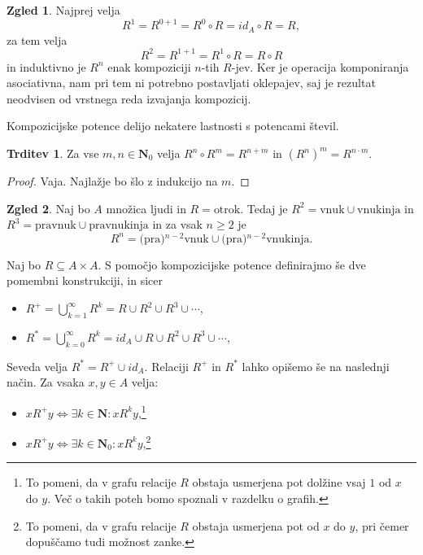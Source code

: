 \documentclass[11pt]{book}
\def\NN{\mathbf{N}}
\theoremstyle{definition}
\theoremstyle{zgled}
\newtheorem*{zgled}{Zgled}
\theoremstyle{odprtproblem}
\theoremstyle{domacanaloga}
\newenvironment{dokaz}
    {\color{siva}\begin{proof}}
    {\end{proof}}
\theoremstyle{izrek}
\newtheorem*{trditev}{Trditev}
\begin{document}
\begin{zgled}
Najprej velja
\[
    R^1 = R^{0+1} = R^0 \circ R = id_A \circ R = R,
\]
za tem velja
\[
    R^2 = R^{1+1} = R^1 \circ R = R \circ R
\]
in induktivno je $R^n$ enak kompoziciji $n$-tih $R$-jev. Ker je operacija komponiranja asociativna, nam pri tem ni potrebno postavljati oklepajev, saj je rezultat neodvisen od vrstnega reda izvajanja kompozicij.
\end{zgled}

Kompozicijske potence delijo nekatere lastnosti s potencami števil.

\begin{trditev}
Za vse $m,n \in \NN_0$ velja $R^n \circ R^m = R^{n+m}$ in $(R^n)^m = R^{n \cdot m}$.
\end{trditev}
\begin{dokaz}
    Vaja. Najlažje bo šlo z indukcijo na $m$.
\end{dokaz}

\begin{zgled}
Naj bo $A$ množica ljudi in $R = \text{otrok}$. Tedaj je $R^2 = \text{vnuk} \cup \text{vnukinja}$ in $R^3 = \text{pravnuk} \cup \text{pravnukinja}$ in za vsak $n \geq 2$ je
\[
    R^n = \text{(pra)$^{n-2}$vnuk} \cup \text{(pra)$^{n-2}$vnukinja}.
\]
\end{zgled}

Naj bo $R \subseteq A \times A$. S pomočjo kompozicijske potence definirajmo še dve pomembni konstrukciji, in sicer
\begin{itemize}
    \item $R^+ = \bigcup_{k = 1}^\infty R^k = R \cup R^2 \cup R^3 \cup \cdots$,
    \item $R^* = \bigcup_{k = 0}^\infty R^k = id_A \cup R \cup R^2 \cup R^3 \cup \cdots$,
\end{itemize}
Seveda velja $R^* = R^+ \cup id_A$. Relaciji $R^+$ in $R^*$ lahko opišemo še na naslednji način. Za vsaka $x,y \in A$ velja:
\begin{itemize}
    \item $x R^+ y \Leftrightarrow \exists k \in \NN \colon x R^k y$,\footnote{To pomeni, da v grafu relacije $R$ obstaja usmerjena pot dolžine vsaj $1$ od $x$ do $y$. Več o takih poteh bomo spoznali v razdelku o grafih.}
    \item $x R^+ y \Leftrightarrow \exists k \in \NN_0 \colon x R^k y$,\footnote{To pomeni, da v grafu relacije $R$ obstaja usmerjena pot od $x$ do $y$, pri čemer dopuščamo tudi možnost zanke.}
\end{itemize}
\end{document}
